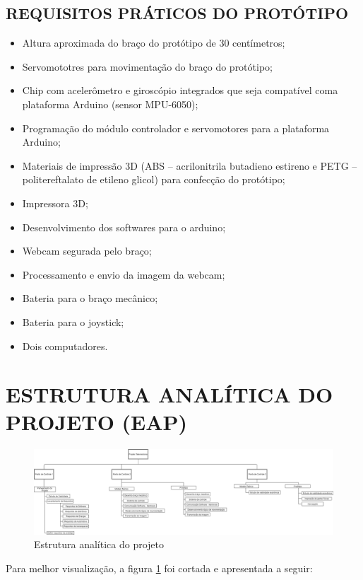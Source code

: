 \subsection{REQUISITOS PRÁTICOS DO PROTÓTIPO}

\begin{itemize}
\item Altura aproximada do braço do protótipo de 30 centímetros;
\item Servomototres para movimentação do braço do protótipo;
\item Chip com acelerômetro e giroscópio integrados que seja compatível coma plataforma Arduino (sensor MPU-6050);
\item Programação do módulo controlador e servomotores para a plataforma Arduino;
\item Materiais de impressão 3D (ABS – acrilonitrila butadieno estireno e PETG – politereftalato de etileno glicol) para confecção do protótipo;
\item Impressora 3D;
\item Desenvolvimento dos softwares para o arduino;
\item Webcam segurada pelo braço;
\item Processamento e envio da imagem da webcam;
\item Bateria para o braço mecânico;
\item Bateria para o joystick;
\item Dois computadores.
\end{itemize}

\section{ESTRUTURA ANALÍTICA DO PROJETO (EAP)}

\begin{figure}[h]
	\centering
	\includegraphics[keepaspectratio=true,scale=0.21]{figuras/eap_pi1.png}
	\caption{Estrutura analítica do projeto}
	\label{eap_fig01}
\end{figure}

Para melhor visualização, a figura \ref{eap_fig01} foi cortada e apresentada a seguir:

